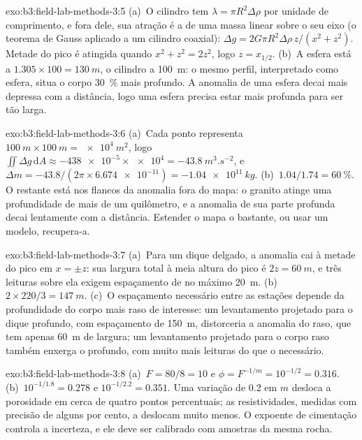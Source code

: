 \begin{solution}{exo:b3:field-lab-methods-3:5}
(a)~O cilindro tem $\lambda = \pi R^2\Delta\rho$ por unidade de comprimento, e
fora dele, sua atração é a de uma massa linear sobre o seu eixo (o teorema de Gauss
aplicado a um cilindro coaxial): $\Delta g = 2G\pi R^2\Delta\rho\,z/(x^2
+ z^2)$. Metade do pico é atingida quando $x^2 + z^2 = 2z^2$, logo $z =
x_{1/2}$. (b)~A esfera está a $1.305\times100 = \qty{130}{m}$, o
cilindro a \qty{100}{m}: o mesmo perfil, interpretado como esfera, situa o
corpo \qty{30}{\percent} mais profundo. A anomalia de uma esfera decai mais depressa com
a distância, logo uma esfera precisa estar mais profunda para ser tão larga.
\end{solution}

\begin{solution}{exo:b3:field-lab-methods-3:6}
(a)~Cada ponto representa $\qty{100}{m}\times\qty{100}{m} =
\qty{e4}{m^2}$, logo $\iint\Delta g\,\mathrm{d}A \approx
\num{-438e-5}\times\num{e4} = \qty{-43.8}{m^3.s^{-2}}$, e $\Delta m
= -43.8/(2\pi\times\num{6.674e-11}) = \qty{-1.04e11}{kg}$. (b)~$1.04/1.74
= \qty{60}{\percent}$. O restante está nos flancos da anomalia fora
do mapa: o granito atinge uma profundidade de mais de um quilômetro, e a
anomalia de sua parte profunda decai lentamente com a distância. Estender o mapa
o bastante, ou usar um modelo, recupera-a.
\end{solution}

\begin{solution}{exo:b3:field-lab-methods-3:7}
(a)~Para um dique delgado, a anomalia cai à metade do pico em $x = \pm z$:
sua largura total à meia altura do pico é $2z = \qty{60}{m}$, e três
leituras sobre ela exigem espaçamento de no máximo \qty{20}{m}. (b)~$2\times
220/3 = \qty{147}{m}$. (c)~O espaçamento necessário entre as estações depende da
profundidade do corpo mais raso de interesse: um levantamento projetado para o dique
profundo, com espaçamento de \qty{150}{m}, distorceria a anomalia do raso, que
tem apenas \qty{60}{m} de largura; um levantamento projetado para o corpo raso também enxerga o
profundo, com muito mais leituras do que o necessário.
\end{solution}

\begin{solution}{exo:b3:field-lab-methods-3:8}
(a)~$F = 80/8 = 10$ e $\phi = F^{-1/m} = 10^{-1/2} = \num{0.316}$.
(b)~$10^{-1/1.8} = \num{0.278}$ e $10^{-1/2.2} = \num{0.351}$. Uma variação
de \num{0.2} em $m$ desloca a porosidade em cerca de quatro pontos percentuais;
as resistividades, medidas com precisão de alguns por cento, a deslocam muito menos. O
expoente de cimentação controla a incerteza, e ele deve ser calibrado
com amostras da mesma rocha.
\end{solution}

